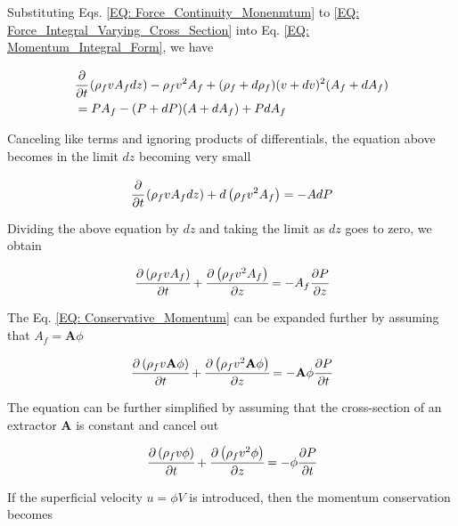 \documentclass[../Article_Model_Parameters.tex]{subfiles}
\begin{document}
	Substituting Eqs. \ref{EQ: Force_Continuity_Monenmtum} to \ref{EQ: Force_Integral_Varying_Cross_Section} into Eq. \ref{EQ: Momentum_Integral_Form}, we have
	
	{\footnotesize
		\begin{align}
			& \cfrac{\partial}{\partial t} \left( \rho_f v A_f dz \right) - \rho_f v^2 A_f + (\rho_f + d\rho_f)(v+dv)^2(A_f+dA_f)  \nonumber \\
			&= PA_f - (P+dP)(A+dA_f)+PdA_f
		\end{align}
	}
	
	Canceling like terms and ignoring products of differentials, the equation above becomes in the limit $dz$ becoming  very small
	
	{\footnotesize
		\begin{equation}
			\cfrac{\partial}{\partial t} \left( \rho_f v A_f dz \right) + d\left( \rho_f v^2 A_f \right) = -A dP
		\end{equation}
	}

	Dividing the above equation by $dz$ and taking the limit as $dz$ goes to zero, we obtain
	
	{\footnotesize
		\begin{equation}
			\cfrac{\partial \left( \rho_f v A_f \right)}{\partial t} + \cfrac{\partial \left( \rho_f v^2 A_f \right)}{\partial z} = -A_f \cfrac{\partial P}{\partial z}
			\label{EQ: Conservative_Momentum}
		\end{equation}
	}

	The Eq. \ref{EQ: Conservative_Momentum} can be expanded further by assuming that $A_f = \textbf{A}\phi$ 
	
	{\footnotesize
		\begin{equation}
			\cfrac{\partial \left( \rho_f v \textbf{A} \phi \right) }{\partial t} + \cfrac{\partial \left( \rho_f v^2 \textbf{A} \phi \right) }{\partial z} = - 	\textbf{A} \phi \cfrac{\partial P}{\partial t}
		\end{equation}
	}

	The equation can be further simplified by assuming that the cross-section of an extractor $\textbf{A}$ is constant and cancel out
	
	{\footnotesize
		\begin{equation}
			\cfrac{\partial \left( \rho_f v \phi \right) }{\partial t} + \cfrac{\partial \left( \rho_f v^2 \phi \right) }{\partial z} = - \phi 	\cfrac{\partial P}{\partial t}
		\end{equation}
	}

	If the superficial velocity $u=\phi V$ is introduced, then the momentum conservation becomes
	
\end{document}
